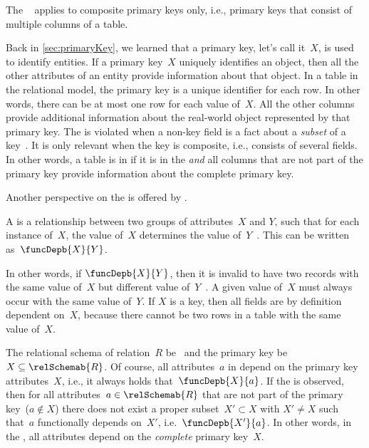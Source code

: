 %
\label{sec:normalForm:2}%
%
The ~\cite{C1971FNOTDBRM,C1971NDBSABT,K1983ASGTFNFIRDT,D2003AITDS,EN2015FODS} applies to composite primary keys only, i.e., primary keys that consist of multiple columns of a table.

Back in \cref{sec:primaryKey}, we learned that a primary key, let's call it~$X$, is used to identify entities.
If a primary key~$X$ uniquely identifies an object, then all the other attributes of an entity provide information about that object.
In a table in the relational model, the primary key is a unique identifier for each row.
In other words, there can be at most one row for each value of~$X$.
All the other columns provide additional information about the real-world object represented by that primary key.
The  is violated when a non-key field is a fact about a \emph{subset} of a key~\cite{K1983ASGTFNFIRDT}.
It is only relevant when the key is composite, i.e., consists of several fields.
In other words, a table is in  if it is in the  \emph{and} all columns that are not part of the primary key provide information about the complete primary key.

Another perspective on the  is offered by .%
%
\begin{definition}%
\label{def:functionalDependency}%
A \emph{} is a relationship between two groups of attributes~$X$ and $Y$, such that for each instance of~$X$, the value of~$X$ determines the value of~$Y$~\cite{S2024D:RNDAFDNF}. %
This can be written as~$\funcDepb{X}{Y}$.%
\end{definition}%
%
In other words, if $\funcDepb{X}{Y}$, then it is invalid to have two records with the same value of~$X$ but different value of~$Y$~\cite{K1983ASGTFNFIRDT}.
A given value of~$X$ must always occur with the same value of~$Y$.
If $X$ is a key, then all fields are by definition dependent on~$X$, because there cannot be two rows in a table with the same value of~$X$.

The relational schema of relation~$R$ be~ and the primary key be~$X\subseteq\relSchemab{R}$.
Of course, all attributes~$a$ in depend on the primary key attributes~$X$, i.e., it always holds that~$\funcDepb{X}{a}$.
If the  is observed, then for all attributes~$a\in\relSchemab{R}$ that are not part of the primary key~($a \not\in X$) there does not exist a proper subset~$X'\subset X$ with $X'\neq X$ such that~$a$ functionally depends on~$X'$, i.e.~$\funcDepb{X'}{a}$.
In other words, in the , all attributes depend on the \emph{complete} primary key~$X$.%
%
%
%
\endhsection%
%
